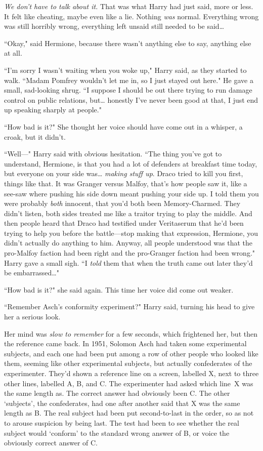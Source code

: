 \emph{We don't have to talk about it.} That was what Harry had just said, more or less. It felt like cheating, maybe even like a lie. Nothing \emph{was} normal. Everything wrong was still horribly wrong, everything left unsaid still needed to be said{\ldots}

``Okay," said Hermione, because there wasn't anything else to say, anything else at all.

``I'm sorry I wasn't waiting when you woke up," Harry said, as they started to walk. ``Madam Pomfrey wouldn't let me in, so I just stayed out here." He gave a small, sad-looking shrug. ``I suppose I should be out there trying to run damage control on public relations, but{\ldots} honestly I've never been good at that, I just end up speaking sharply at people."

``How bad is it?" She thought her voice should have come out in a whisper, a croak, but it didn't.

``Well—" Harry said with obvious hesitation. ``The thing you've got to understand, Hermione, is that you had a lot of defenders at breakfast time today, but everyone on your side was{\ldots} \emph{making stuff up}. Draco tried to kill you first, things like that. It was Granger versus Malfoy, that's how people saw it, like a see-saw where pushing his side down meant pushing your side up. I told them you were probably \emph{both} innocent, that you'd both been Memory-Charmed. They didn't listen, both sides treated me like a traitor trying to play the middle. And then people heard that Draco had testified under Veritaserum that he'd been trying to help you before the battle—stop making that expression, Hermione, you didn't actually do anything to him. Anyway, all people understood was that the pro-Malfoy faction had been right and the pro-Granger faction had been wrong." Harry gave a small sigh. ``I \emph{told} them that when the truth came out later they'd be embarrassed{\ldots}"

``How bad is it?" she said again. This time her voice did come out weaker.

``Remember Asch's conformity experiment?" Harry said, turning his head to give her a serious look.

Her mind was \emph{slow to remember} for a few seconds, which frightened her, but then the reference came back. In 1951, Solomon Asch had taken some experimental subjects, and each one had been put among a row of other people who looked like them, seeming like other experimental subjects, but actually confederates of the experimenter. They'd shown a reference line on a screen, labelled X, next to three other lines, labelled A, B, and C\@. The experimenter had asked which line~X was the same length as. The correct answer had obviously been C\@. The other `subjects', the confederates, had one after another said that X was the same length as B\@. The real subject had been put second-to-last in the order, so as not to arouse suspicion by being last. The test had been to see whether the real subject would `conform' to the standard wrong answer of B, or voice the obviously correct answer of C\@.

